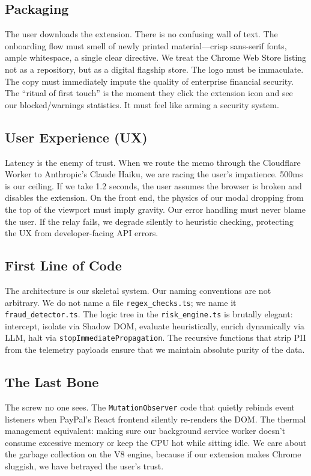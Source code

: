 \documentclass[11pt, letterpaper]{article}
\begin{document}
\subsection*{Packaging}
The user downloads the extension. There is no confusing wall of text. The onboarding flow must smell of newly printed material---crisp sans-serif fonts, ample whitespace, a single clear directive. We treat the Chrome Web Store listing not as a repository, but as a digital flagship store. The logo must be immaculate. The copy must immediately impute the quality of enterprise financial security. The ``ritual of first touch'' is the moment they click the extension icon and see our blocked/warnings statistics. It must feel like arming a security system.

\subsection*{User Experience (UX)}
Latency is the enemy of trust. When we route the memo through the Cloudflare Worker to Anthropic's Claude Haiku, we are racing the user's impatience. 500ms is our ceiling. If we take 1.2 seconds, the user assumes the browser is broken and disables the extension. On the front end, the physics of our modal dropping from the top of the viewport must imply gravity. Our error handling must never blame the user. If the relay fails, we degrade silently to heuristic checking, protecting the UX from developer-facing API errors. 

\subsection*{First Line of Code}
The architecture is our skeletal system. Our naming conventions are not arbitrary. We do not name a file \texttt{regex\_checks.ts}; we name it \texttt{fraud\_detector.ts}. The logic tree in the \texttt{risk\_engine.ts} is brutally elegant: intercept, isolate via Shadow DOM, evaluate heuristically, enrich dynamically via LLM, halt via \texttt{stopImmediatePropagation}. The recursive functions that strip PII from the telemetry payloads ensure that we maintain absolute purity of the data. 

\subsection*{The Last Bone}
The screw no one sees. The \texttt{MutationObserver} code that quietly rebinds event listeners when PayPal's React frontend silently re-renders the DOM. The thermal management equivalent: making sure our background service worker doesn't consume excessive memory or keep the CPU hot while sitting idle. We care about the garbage collection on the V8 engine, because if our extension makes Chrome sluggish, we have betrayed the user's trust.
\end{document}
